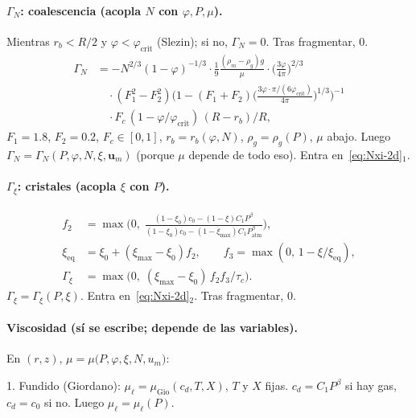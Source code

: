 \documentclass[11pt,a4paper]{article}
\begin{document}
\paragraph{$\Gamma_N$: coalescencia (acopla $N$ con $\varphi,P,\mu$).}
Mientras $r_b<R/2$ y $\varphi<\varphi_{\mathrm{crit}}$
(Slezin); si no, $\Gamma_N=0$. Tras fragmentar, $0$.
\begin{equation}
\label{eq:Gamma-N}
\begin{aligned}
\Gamma_N
&=-N^{2/3}(1-\varphi)^{-1/3}
\cdot\frac19\frac{(\rho_m-\rho_g)g}{\mu}
\cdot\Biggl(\frac{3\varphi}{4\pi}\Biggr)^{2/3}
\\
&\quad\cdot(F_1^2-F_2^2)
\Biggl(1-(F_1+F_2)
\Biggl(\frac{3\varphi\cdot\pi/(6\varphi_{\mathrm{crit}})}{4\pi}\Biggr)^{1/3}
\Biggr)^{-1}
\\
&\quad\cdot F_c\,(1-\varphi/\varphi_{\mathrm{crit}})\,(R-r_b)/R,
\end{aligned}
\end{equation}
$F_1=1.8$, $F_2=0.2$, $F_c\in[0,1]$,
$r_b=r_b(\varphi,N)$, $\rho_g=\rho_g(P)$, $\mu$ abajo.
Luego $\Gamma_N=\Gamma_N(P,\varphi,N,\xi,\mathbf{u}_m)$
(porque $\mu$ depende de todo eso). Entra
en~\eqref{eq:Nxi-2d}$_1$.

\paragraph{$\Gamma_\xi$: cristales (acopla $\xi$ con $P$).}
\begin{equation}
\label{eq:Gamma-xi}
\begin{aligned}
f_2
&=\max\Biggl(0,\;
\frac{(1-\xi_0)c_0-(1-\xi)C_1 P^{\beta}}
{(1-\xi_0)c_0-(1-\xi_{\max})C_1 P_{\mathrm{atm}}^{\beta}}\Biggr),
\\
\xi_{\mathrm{eq}}
&=\xi_0+(\xi_{\max}-\xi_0)f_2,
\qquad
f_3=\max(0,\,1-\xi/\xi_{\mathrm{eq}}),
\\
\Gamma_\xi
&=\max\bigl(0,\;(\xi_{\max}-\xi_0)\,f_2 f_3/\tau_c\bigr).
\end{aligned}
\end{equation}
$\Gamma_\xi=\Gamma_\xi(P,\xi)$. Entra
en~\eqref{eq:Nxi-2d}$_2$. Tras fragmentar, $0$.

\paragraph{Viscosidad (sí se escribe; depende de las variables).}
En $(r,z)$,
$\mu=\mu\bigl(P,\varphi,\xi,N,u_m\bigr)$:

1. Fundido (Giordano): $\mu_\ell=\mu_{\mathrm{Gio}}(c_d,T,X)$,
$T$ y $X$ fijas. $c_d=C_1 P^\beta$ si hay gas, $c_d=c_0$ si
no. Luego $\mu_\ell=\mu_\ell(P)$.
\end{document}

